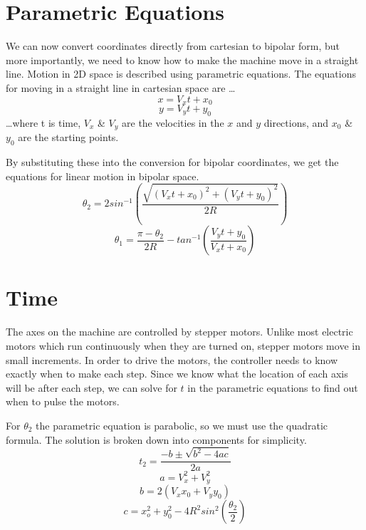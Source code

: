 \documentclass[12pt,letterpaper]{report}
\begin{document}
\section*{Parametric Equations}
We can now convert coordinates directly from cartesian to bipolar form, but more importantly, we need to know how to make the machine move in a straight line. Motion in 2D space is described using parametric equations. The equations for moving in a straight line in cartesian space are \ldots
\begin{equation}
	x = V_x t + x_0
\end{equation}
\begin{equation}
	y = V_y t + y_0
\end{equation}
\ldots where t is time, $V_x$ \& $V_y$ are the velocities in the $x$ and $y$ directions, and $x_0$ \& $y_0$ are the starting points.

By substituting these into the conversion for bipolar coordinates, we get the equations for linear motion in bipolar space.
\begin{equation}
	\theta_2 = 2 sin^{-1} \left(  \frac{\sqrt{(V_xt+x_0)^2 + (V_yt+y_0)^2}}{2R} \right)
\end{equation}
\begin{equation}
	\theta_1 = \frac{\pi-\theta_2}{2R} - tan^{-1} \left( \frac{V_y t + y_0}{V_x t + x_0} \right)
\end{equation}

\section*{Time}
The axes on the machine are controlled by stepper motors. Unlike most electric motors which run continuously when they are turned on, stepper motors move in small increments. In order to drive the motors, the controller needs to know exactly when to make each step. Since we know what the location of each axis will be after each step, we can solve for $t$ in the parametric equations to find out when to pulse the motors.

For $\theta_2$ the parametric equation is parabolic, so we must use the quadratic formula. The solution is broken down into components for simplicity.
\begin{equation}
	t_2 = \frac{-b\pm\sqrt{b^2-4ac}}{2a}
\end{equation}
\begin{equation}
	a = V_x^2+V_y^2
\end{equation}
\begin{equation}
	b = 2(V_x x_0 + V_y y_0)
\end{equation}
\begin{equation}
	c = x_o^2 + y_0^2 - 4R^2sin^2 \left( \frac{\theta_2}{2} \right)
\end{equation}
\end{document}
